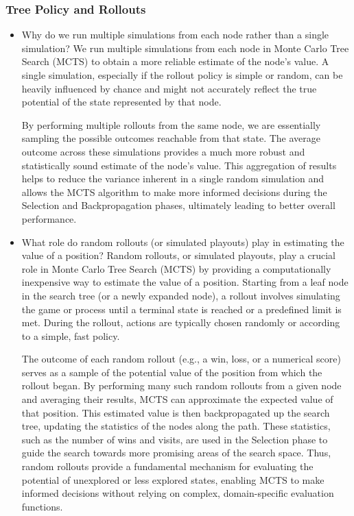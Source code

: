 \subsubsection{Tree Policy and Rollouts}
\begin{itemize} 
   \item Why do we run multiple simulations from each node rather than a single simulation? 
   We run multiple simulations from each node in Monte Carlo Tree Search (MCTS) to obtain a more reliable estimate of the node's value. A single simulation, especially if the rollout policy is simple or random, can be heavily influenced by chance and might not accurately reflect the true potential of the state represented by that node.

By performing multiple rollouts from the same node, we are essentially sampling the possible outcomes reachable from that state. The average outcome across these simulations provides a much more robust and statistically sound estimate of the node's value. This aggregation of results helps to reduce the variance inherent in a single random simulation and allows the MCTS algorithm to make more informed decisions during the Selection and Backpropagation phases, ultimately leading to better overall performance.
   \item What role do random rollouts (or simulated playouts) play in estimating the value of a position?
   Random rollouts, or simulated playouts, play a crucial role in Monte Carlo Tree Search (MCTS) by providing a computationally inexpensive way to estimate the value of a position. Starting from a leaf node in the search tree (or a newly expanded node), a rollout involves simulating the game or process until a terminal state is reached or a predefined limit is met. During the rollout, actions are typically chosen randomly or according to a simple, fast policy.

The outcome of each random rollout (e.g., a win, loss, or a numerical score) serves as a sample of the potential value of the position from which the rollout began. By performing many such random rollouts from a given node and averaging their results, MCTS can approximate the expected value of that position. This estimated value is then backpropagated up the search tree, updating the statistics of the nodes along the path. These statistics, such as the number of wins and visits, are used in the Selection phase to guide the search towards more promising areas of the search space. Thus, random rollouts provide a fundamental mechanism for evaluating the potential of unexplored or less explored states, enabling MCTS to make informed decisions without relying on complex, domain-specific evaluation functions.
\end{itemize}



